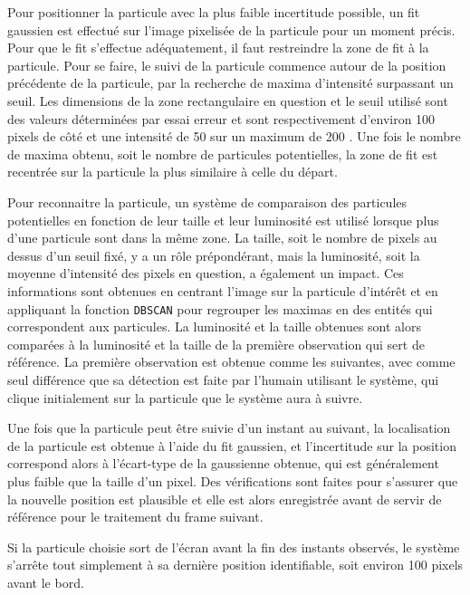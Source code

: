 \documentclass[11pt,letterpaper]{article}
\begin{document}
Pour positionner la particule avec la plus faible incertitude possible, un 
fit gaussien est effectué sur l'image pixelisée de la particule pour un moment précis. Pour que le fit s'effectue
adéquatement, il faut restreindre la zone de fit à la particule. Pour se faire, le suivi de la particule commence 
autour de la position précédente de la particule, par la recherche de maxima d'intensité surpassant un seuil. Les
dimensions de la zone rectangulaire en question et le seuil utilisé sont des valeurs déterminées par essai erreur
et sont respectivement d'environ 100 pixels de côté et une intensité de 50 sur un maximum de 200 .
Une fois le nombre de maxima obtenu, soit le nombre de particules potentielles, la zone de fit est recentrée sur 
la particule la plus similaire à celle du départ.  

Pour reconnaitre la particule, un système de comparaison des particules potentielles en fonction de leur taille 
et leur luminosité est utilisé lorsque plus d'une particule sont dans la même zone. 
La taille, soit le nombre de pixels au dessus d'un seuil fixé, y a un rôle prépondérant, mais la luminosité, soit 
la moyenne d'intensité des pixels en question, a également un impact. Ces informations sont obtenues en centrant 
l'image sur la particule d'intérêt et en appliquant la fonction \texttt{DBSCAN} pour regrouper les maximas en des entités
qui correspondent aux particules. La luminosité et la taille obtenues sont alors comparées à la luminosité et la 
taille de la première observation qui sert de référence. La première observation est obtenue comme les suivantes,
avec comme seul différence que sa détection est faite par l'humain utilisant le système, qui clique initialement 
sur la particule que le système aura à suivre.

Une fois que la particule peut être suivie d'un instant au suivant, la localisation de la particule est obtenue à 
l'aide du fit gaussien, et l'incertitude sur la position correspond alors à l'écart-type de la gaussienne obtenue, 
qui est généralement plus faible que la taille d'un pixel. 
Des vérifications sont faites pour s'assurer que la nouvelle position est plausible et elle est alors
enregistrée avant de servir de référence pour le traitement du frame suivant.

Si la particule choisie sort de l'écran avant la fin des instants observés, le système s'arrête tout simplement à 
sa dernière position identifiable, soit environ 100 pixels avant le bord.
\end{document}
